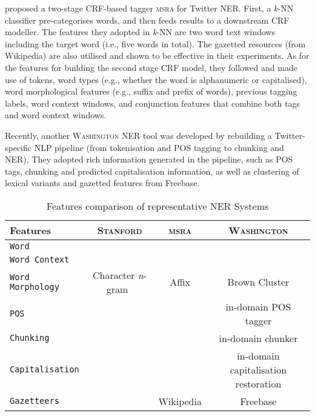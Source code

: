 \documentclass[11pt]{article}
\newcommand{\eg}{e.g.,\xspace}
\newcommand{\ie}{i.e.,\xspace}
\newcommand{\ngram}{\textit{n}-gram\ }
\newcommand{\stanford}{\textsc{Stanford}\xspace}
\newcommand{\washington}{\textsc{Washington}\xspace}
\newcommand{\msra}{\textsc{msra}\xspace}
\newcommand{\feature}[1]{\texttt{#1}\xspace}
\newcommand{\cmark}{\ding{51}}%
\newcommand{\xmark}{\ding{55}}%
\begin{document}
 proposed a two-stage CRF-based tagger \msra for Twitter NER.
First, a \textit{k}-NN classifier pre-categorises words, and then feeds results to a downstream CRF modeller.
The features they adopted in \textit{k}-NN are two word text windows including the target word (\ie five words in total).
The gazetted resources (from Wikipedia) are also utilised and shown to be effective in their experiments.
As for the features for building the second stage CRF model, they followed  and made use of tokens, word types (\eg whether the word is alphanumeric or capitalised), word morphological features (\eg suffix and prefix of words), previous tagging labels, word context windows, and conjunction features that combine both tags and word context windows.


Recently, another \washington NER tool \cite{emnlp11ritt} was developed by rebuilding a Twitter-specific NLP pipeline (from tokenisation and POS tagging to chunking and NER).
They adopted rich information generated in the pipeline, such as POS tags, chunking and predicted capitalisation information, as well as clustering of lexical variants \cite{cl92brow} and gazetted features from Freebase.

\begin{table*}[!htbp]
\begin{center}
\begin{tabular}{lccc}
\toprule
Features                                     & \stanford & \msra & \washington \\ 
\midrule
\feature{Word}                               & \cmark & \cmark & \cmark \\
\feature{Word Context}                       & \cmark & \cmark & \cmark \\
\feature{Word Morphology}                    & Character \ngram  & Affix & Brown Cluster \\
\feature{POS}                                & \cmark & \xmark & in-domain POS tagger\\
\feature{Chunking}                           & \xmark & \xmark & in-domain chunker \\
\feature{Capitalisation}                     & \xmark & \cmark & in-domain capitalisation restoration\\
\feature{Gazetteers}                         & \xmark & Wikipedia & Freebase \\
\bottomrule
\end{tabular}
\end{center}
\caption{Features comparison of representative NER Systems}
\label{tab:fea_comp}
\end{table*}
\end{document}

